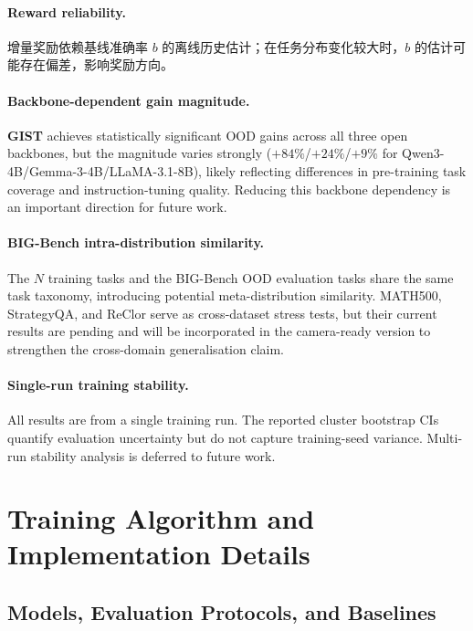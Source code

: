 \documentclass[11pt]{article}
\newcommand{\gist}{\textbf{GIST}}
\begin{document}
\paragraph{Reward reliability.}
增量奖励依赖基线准确率 $b$ 的离线历史估计；在任务分布变化较大时，$b$ 的估计可能存在偏差，影响奖励方向。

\paragraph{Backbone-dependent gain magnitude.}
\gist{} achieves statistically significant OOD gains across all three open backbones, but the magnitude varies strongly ($+84\%$/$+24\%$/$+9\%$ for Qwen3-4B/Gemma-3-4B/LLaMA-3.1-8B), likely reflecting differences in pre-training task coverage and instruction-tuning quality.
Reducing this backbone dependency is an important direction for future work.

\paragraph{BIG-Bench intra-distribution similarity.}
The $N$ training tasks and the BIG-Bench OOD evaluation tasks share the same task taxonomy, introducing potential meta-distribution similarity.
MATH500, StrategyQA, and ReClor serve as cross-dataset stress tests, but their current results are pending and will be incorporated in the camera-ready version to strengthen the cross-domain generalisation claim.

\paragraph{Single-run training stability.}
All results are from a single training run.
The reported cluster bootstrap CIs quantify evaluation uncertainty but do not capture training-seed variance.
Multi-run stability analysis is deferred to future work.



\appendix

\section{Training Algorithm and Implementation Details}
\label{app:training}

\subsection{Models, Evaluation Protocols, and Baselines}
\label{app:models}
\end{document}

